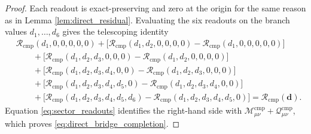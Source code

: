 \documentclass[11pt]{article}
\newcommand{\CompMix}{\mathcal M_{\mu\nu}^{\mathrm{cmp}}}
\newcommand{\CompQuad}{\mathcal Q_{\mu\nu}^{\mathrm{cmp}}}
\newcommand{\CompletionRead}{\mathscr R_{\mathrm{cmp}}}
\begin{document}
\begin{proof}
Each readout is exact-preserving and zero at the origin for the same reason as in Lemma \ref{lem:direct_residual}. Evaluating the six readouts on the branch values \(d_1,\ldots,d_6\) gives the telescoping identity
\[
\begin{aligned}
&\CompletionRead(d_1,0,0,0,0,0)
+\bigl[\CompletionRead(d_1,d_2,0,0,0,0)-\CompletionRead(d_1,0,0,0,0,0)\bigr]
\\
&\qquad
+\bigl[\CompletionRead(d_1,d_2,d_3,0,0,0)-\CompletionRead(d_1,d_2,0,0,0,0)\bigr]
\\
&\qquad
+\bigl[\CompletionRead(d_1,d_2,d_3,d_4,0,0)-\CompletionRead(d_1,d_2,d_3,0,0,0)\bigr]
\\
&\qquad
+\bigl[\CompletionRead(d_1,d_2,d_3,d_4,d_5,0)-\CompletionRead(d_1,d_2,d_3,d_4,0,0)\bigr]
\\
&\qquad
+\bigl[\CompletionRead(d_1,d_2,d_3,d_4,d_5,d_6)-\CompletionRead(d_1,d_2,d_3,d_4,d_5,0)\bigr]
=\CompletionRead(\mathbf d).
\end{aligned}
\]
Equation \eqref{eq:sector_readouts} identifies the right-hand side with \(\CompMix+\CompQuad\), which proves \eqref{eq:direct_bridge_completion}.
\end{proof}
\end{document}
